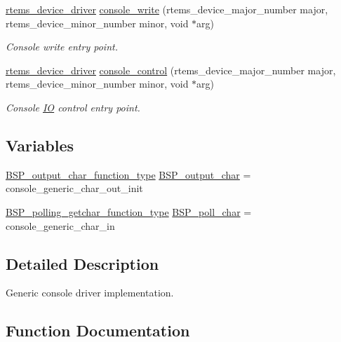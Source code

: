 \begin{DoxyCompactItemize}
\mbox{\hyperlink{group__ClassicStatus_ga545d41846817eaba6143d52ee4d9e9fe}{rtems\+\_\+device\+\_\+driver}} \mbox{\hyperlink{mpc55xxevb_2console_2console-generic_8c_a211cf468eb7aec89e37bc784a62753ce}{console\+\_\+write}} (rtems\+\_\+device\+\_\+major\+\_\+number major, rtems\+\_\+device\+\_\+minor\+\_\+number minor, void $\ast$arg)
\begin{DoxyCompactList}\small\item\em Console write entry point. \end{DoxyCompactList}\item 
\mbox{\hyperlink{group__ClassicStatus_ga545d41846817eaba6143d52ee4d9e9fe}{rtems\+\_\+device\+\_\+driver}} \mbox{\hyperlink{mpc55xxevb_2console_2console-generic_8c_a3ecfcbb4d683d7d77476039aba0f94db}{console\+\_\+control}} (rtems\+\_\+device\+\_\+major\+\_\+number major, rtems\+\_\+device\+\_\+minor\+\_\+number minor, void $\ast$arg)
\begin{DoxyCompactList}\small\item\em Console \mbox{\hyperlink{structIO}{IO}} control entry point. \end{DoxyCompactList}\end{DoxyCompactItemize}
\subsection*{Variables}
\begin{DoxyCompactItemize}
\item 
\mbox{\hyperlink{bspIo_8h_a0b0dff1c3d35110ae303b4098c60dc14}{B\+S\+P\+\_\+output\+\_\+char\+\_\+function\+\_\+type}} \mbox{\hyperlink{mpc55xxevb_2console_2console-generic_8c_a5fb8c9c4f076f0340b4a17ed432ced5c}{B\+S\+P\+\_\+output\+\_\+char}} = console\+\_\+generic\+\_\+char\+\_\+out\+\_\+init
\item 
\mbox{\hyperlink{bspIo_8h_a132b9ceff428a634ece5dfaac7ef1006}{B\+S\+P\+\_\+polling\+\_\+getchar\+\_\+function\+\_\+type}} \mbox{\hyperlink{mpc55xxevb_2console_2console-generic_8c_ae5846eecdfa8f2813504371bf01c29b0}{B\+S\+P\+\_\+poll\+\_\+char}} = console\+\_\+generic\+\_\+char\+\_\+in
\end{DoxyCompactItemize}


\subsection{Detailed Description}
Generic console driver implementation. 



\subsection{Function Documentation}
\mbox{\label{mpc55xxevb_2console_2console-generic_8c_a4efabb094608f8155b1a679e03f2eafc}} 
